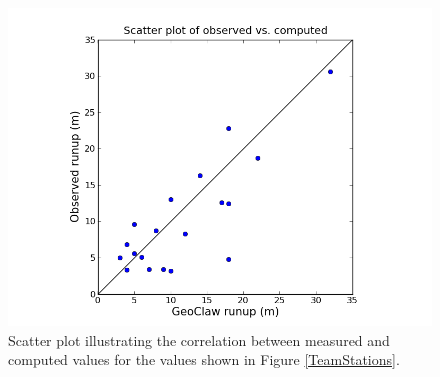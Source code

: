 
\begin{figure}[ht]
\hfil\includegraphics[width=5.0in]{bp9/scatter.png}\hfil
\caption{\label{bp9scatter}
Scatter plot illustrating the correlation between measured and computed
values for the values shown in Figure \ref{TeamStations}.
  }
\end{figure}

% 


